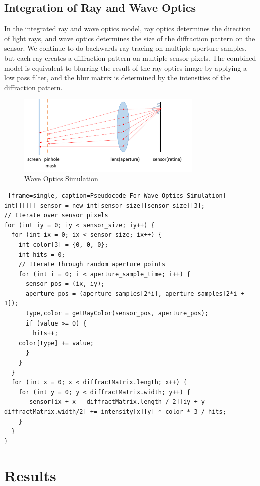 \documentclass{acmsiggraph}
\begin{document}
\subsection{Integration of Ray and Wave Optics}

In the integrated ray and wave optics model, ray optics determines the direction of light rays, and wave optics determines the size of the diffraction pattern on the sensor. We continue to do backwards ray tracing on multiple aperture samples, but each ray creates a diffraction pattern on multiple sensor pixels. The combined model is equivalent to blurring the result of the ray optics image by applying a low pass filter, and the blur matrix is determined by the intensities of the diffraction pattern. 

\begin{figure}[ht]
  \centering
  \includegraphics[width=3.5in]{Diffract_Simulation.png}
  \caption{Wave Optics Simulation}
  \label{fig:ferrari}
\end{figure}


\begin{lstlisting} [frame=single, caption=Pseudocode For Wave Optics Simulation]
int[][][] sensor = new int[sensor_size][sensor_size][3];
// Iterate over sensor pixels
for (int iy = 0; iy < sensor_size; iy++) {
  for (int ix = 0; ix < sensor_size; ix++) {
    int color[3] = {0, 0, 0};
    int hits = 0;
    // Iterate through random aperture points
    for (int i = 0; i < aperture_sample_time; i++) {
      sensor_pos = (ix, iy);
      aperture_pos = (aperture_samples[2*i], aperture_samples[2*i + 1]);
      type,color = getRayColor(sensor_pos, aperture_pos);
      if (value >= 0) {
        hits++;
	color[type] += value;
      }
    }
  }
  for (int x = 0; x < diffractMatrix.length; x++) {
    for (int y = 0; y < diffractMatrix.width; y++) {
       sensor[ix + x - diffractMatrix.length / 2][iy + y - diffractMatrix.width/2] += intensity[x][y] * color * 3 / hits;
    }
  }
}
\end{lstlisting}

\section{Results}
\end{document}

